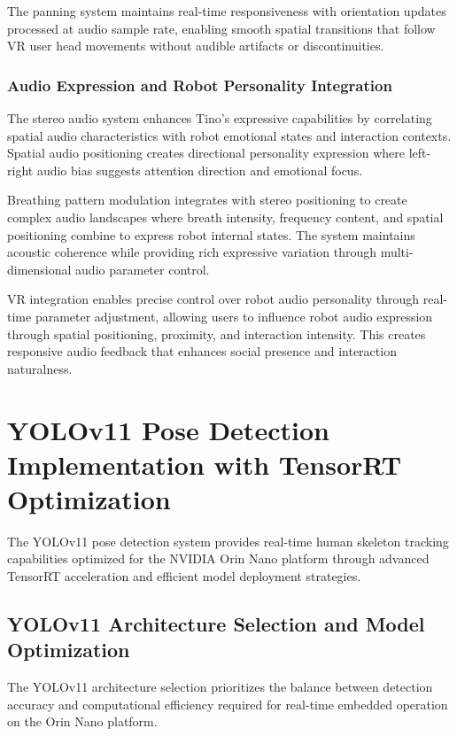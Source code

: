The panning system maintains real-time responsiveness with orientation updates processed at audio sample rate, enabling smooth spatial transitions that follow VR user head movements without audible artifacts or discontinuities.

\subsubsection{Audio Expression and Robot Personality Integration}

The stereo audio system enhances Tino's expressive capabilities by correlating spatial audio characteristics with robot emotional states and interaction contexts. Spatial audio positioning creates directional personality expression where left-right audio bias suggests attention direction and emotional focus.

Breathing pattern modulation integrates with stereo positioning to create complex audio landscapes where breath intensity, frequency content, and spatial positioning combine to express robot internal states. The system maintains acoustic coherence while providing rich expressive variation through multi-dimensional audio parameter control.

VR integration enables precise control over robot audio personality through real-time parameter adjustment, allowing users to influence robot audio expression through spatial positioning, proximity, and interaction intensity. This creates responsive audio feedback that enhances social presence and interaction naturalness.

\section{YOLOv11 Pose Detection Implementation with TensorRT Optimization}

The YOLOv11 pose detection system provides real-time human skeleton tracking capabilities optimized for the NVIDIA Orin Nano platform through advanced TensorRT acceleration and efficient model deployment strategies.

\subsection{YOLOv11 Architecture Selection and Model Optimization}

The YOLOv11 architecture selection prioritizes the balance between detection accuracy and computational efficiency required for real-time embedded operation on the Orin Nano platform.

